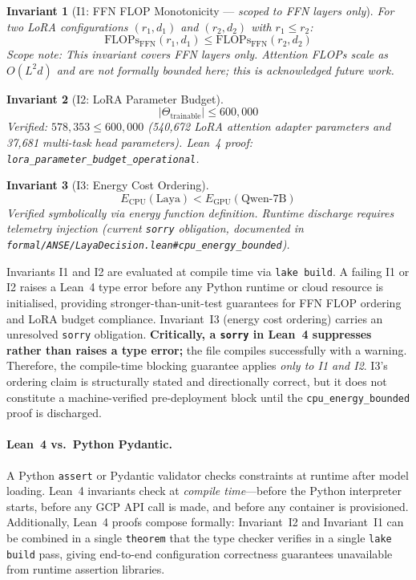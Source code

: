 \documentclass[conference]{IEEEtran}
\newtheorem{invariant}{Invariant}
\begin{document}
\begin{invariant}[I1: FFN FLOP Monotonicity — \emph{scoped to FFN layers only}]
For two LoRA configurations $(r_1, d_1)$ and $(r_2, d_2)$ with $r_1 \leq r_2$:
\[
  \text{FLOPs}_\text{FFN}(r_1, d_1) \leq \text{FLOPs}_\text{FFN}(r_2, d_2)
\]
\emph{Scope note}: This invariant covers FFN layers only. Attention FLOPs scale as
$O(L^2 d)$ and are not formally bounded here; this is acknowledged future work.
\end{invariant}

\begin{invariant}[I2: LoRA Parameter Budget]
\[
  |\Theta_\text{trainable}| \leq 600{,}000
\]
Verified: $578{,}353 \leq 600{,}000$ (540{,}672 LoRA attention adapter parameters and 37{,}681 multi-task head parameters). Lean~4 proof: \texttt{lora\_parameter\_budget\_operational}.
\end{invariant}

\begin{invariant}[I3: Energy Cost Ordering]
\[
  E_\text{CPU}(\text{Laya}) < E_\text{GPU}(\text{Qwen-7B})
\]
Verified symbolically via energy function definition. Runtime discharge requires
telemetry injection (current \texttt{sorry} obligation, documented in
\texttt{formal/ANSE/LayaDecision.lean\#cpu\_energy\_bounded}).
\end{invariant}

Invariants I1 and I2 are evaluated at compile time via \texttt{lake build}. A failing I1 or I2
raises a Lean~4 type error before any Python runtime or cloud resource is initialised,
providing stronger-than-unit-test guarantees for FFN FLOP ordering and LoRA budget compliance.
Invariant~I3 (energy cost ordering) carries an unresolved \texttt{sorry} obligation.
\textbf{Critically, a \texttt{sorry} in Lean~4 suppresses rather than raises a type error;}
the file compiles successfully with a warning. Therefore, the compile-time blocking guarantee
applies \emph{only to I1 and I2}. I3's ordering claim is structurally stated and directionally
correct, but it does not constitute a machine-verified pre-deployment block until the
\texttt{cpu\_energy\_bounded} proof is discharged.

\paragraph{Lean~4 vs.\ Python Pydantic.}
A Python \texttt{assert} or Pydantic validator checks constraints at runtime after
model loading. Lean~4 invariants check at \emph{compile time}—before the Python interpreter
starts, before any GCP API call is made, and before any container is provisioned.
Additionally, Lean~4 proofs compose formally: Invariant~I2 and Invariant~I1 can be
combined in a single \texttt{theorem} that the type checker verifies in a single
\texttt{lake build} pass, giving end-to-end configuration correctness guarantees
unavailable from runtime assertion libraries.
\end{document}
